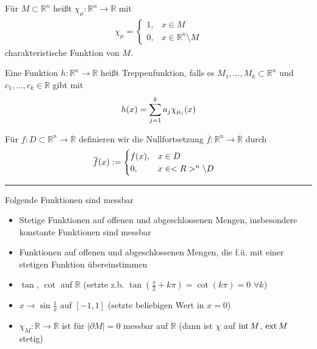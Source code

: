\begin{*definition}
	Für $M\subset\mathbb{R}^n$ heißt $\chi_\mu:\mathbb{R}^n\to\mathbb{R}$ mit \begin{align*}
		\chi_\mu = \begin{cases}
			1, &x\in M\\ 0, &x\in\mathbb{R}^n\setminus M
		\end{cases}
	\end{align*}
	charakteristische Funktion von $M$.
\end{*definition}

\begin{*definition}[Treppenfunktion]
	Eine Funktion $h:\mathbb{R}^n\to\mathbb{R}$ heißt Treppenfunktion, falls es $M_1, \dotsc, M_k\subset\mathbb{R}^n$  und $c_1,\dotsc,c_k\in\mathbb{R}$ gibt mit 
	\begin{align}
		h(x) = \sum_{j=1}^k a_j \chi_{\mu_j}(x)\notag
	\end{align}
\end{*definition}

\begin{*definition}[Nullfortsetzung]
	Für $f:D\subset\mathbb{R}^n\to\overline{\mathbb{R}}$ definieren wir die Nullfortsetzung $\overline{f}:\mathbb{R}^n\to\overline{\mathbb{R}}$ durch \begin{align}
		\overline{f}(x) &:= \begin{cases}
			f(x), &x\in D\\ 0,&x\in\mathbb{R}^n\setminus D
		\end{cases}\notag
	\end{align}
\end{*definition}

\rule{0.4\linewidth}{0.1pt}

\begin{example}
	Folgende Funktionen sind messbar
	\begin{itemize}
		\item Stetige Funktionen auf offenen und abgeschlossenen Mengen, insbesondere konstante Funktionen sind messbar
		\item Funktionen auf offenen und abgeschlossenen Mengen, die f.ü. mit einer stetigen Funktion übereinstimmen
		\item $\tan$, $\cot$ auf $\mathbb{R}$ (setzte z.b. $\tan\left(\frac{\pi}{2}+k\pi\right) = \cot(k\pi) = 0$ $\forall k$)
		\item $x\to \sin\frac{1}{x}$ auf $[-1,1]$ (setzte beliebigen Wert in $x=0$)
		\item $\chi_M:\mathbb{R}\to\mathbb{R}$ ist für $\vert\partial M\vert = 0$ messbar auf $\mathbb{R}$ (dann ist $\chi$ auf $\inn M$, $\ext M$ stetig)
	\end{itemize}
\end{example}
